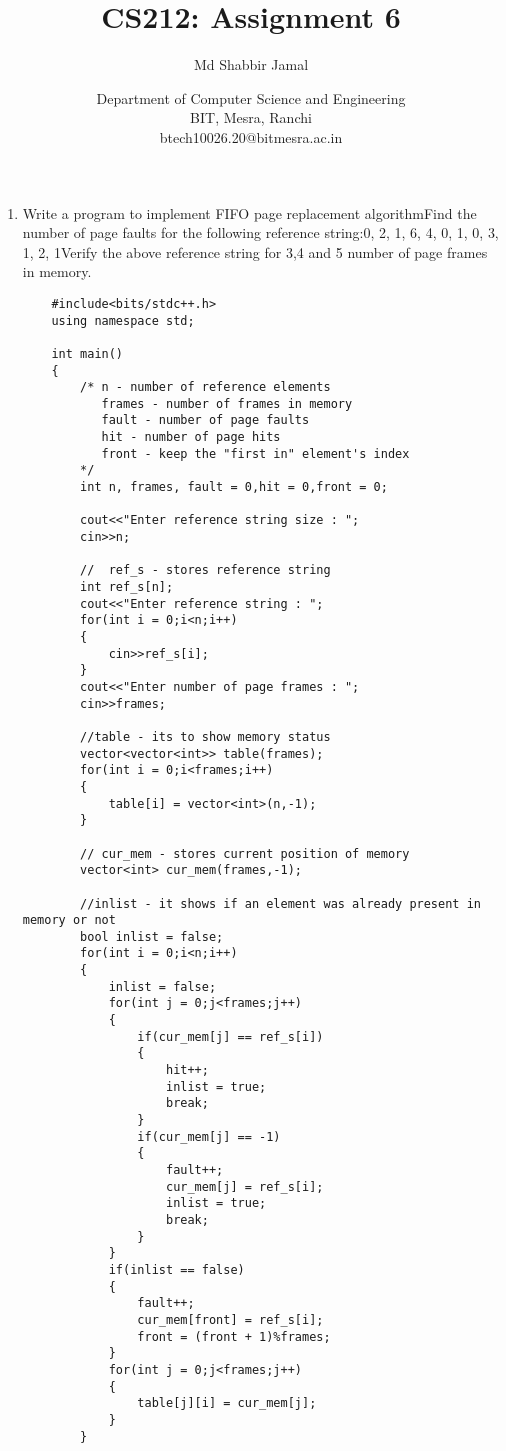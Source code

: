 \documentclass{article}
\title{CS212: Assignment 6}
\author{Md Shabbir Jamal}
\date{Department of Computer Science and Engineering\\
BIT, Mesra, Ranchi\\
btech10026.20@bitmesra.ac.in
}
\begin{document}
\maketitle

\begin{enumerate}
    
\item {{\large Write a program to implement FIFO page replacement algorithmFind the number of page faults for the following reference string:0, 2, 1, 6, 4, 0, 1, 0, 3, 1, 2, 1Verify the above reference string for 3,4 and 5 number of page frames in memory.}
\begin{verbatim}
    #include<bits/stdc++.h>
    using namespace std;
    
    int main()
    {
        /* n - number of reference elements
           frames - number of frames in memory
           fault - number of page faults
           hit - number of page hits
           front - keep the "first in" element's index
        */
        int n, frames, fault = 0,hit = 0,front = 0;
    
        cout<<"Enter reference string size : ";
        cin>>n;
    
        //  ref_s - stores reference string
        int ref_s[n];
        cout<<"Enter reference string : ";
        for(int i = 0;i<n;i++)
        {
            cin>>ref_s[i];
        }
        cout<<"Enter number of page frames : ";
        cin>>frames;
    
        //table - its to show memory status
        vector<vector<int>> table(frames);
        for(int i = 0;i<frames;i++)
        {
            table[i] = vector<int>(n,-1);
        }
    
        // cur_mem - stores current position of memory
        vector<int> cur_mem(frames,-1);
    
        //inlist - it shows if an element was already present in memory or not
        bool inlist = false;
        for(int i = 0;i<n;i++)
        {
            inlist = false;
            for(int j = 0;j<frames;j++)
            {
                if(cur_mem[j] == ref_s[i])
                {
                    hit++;
                    inlist = true;
                    break;
                }
                if(cur_mem[j] == -1)
                {
                    fault++;
                    cur_mem[j] = ref_s[i];
                    inlist = true;
                    break;
                }
            }
            if(inlist == false)
            {
                fault++;
                cur_mem[front] = ref_s[i];
                front = (front + 1)%frames;
            }
            for(int j = 0;j<frames;j++)
            {
                table[j][i] = cur_mem[j];
            }
        }
    

\end{verbatim}}
\end{enumerate}
\end{document}
